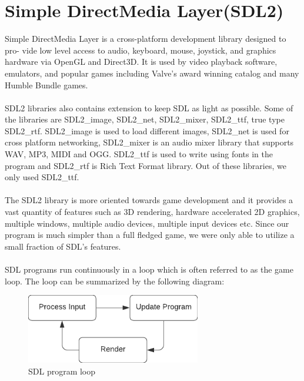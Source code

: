 \documentclass[report]{subfiles}
\begin{document}
    \section{Simple DirectMedia Layer(SDL2)}
    Simple DirectMedia Layer is a cross-platform development library designed to pro-
    vide low level access to audio, keyboard, mouse, joystick, and graphics hardware
    via OpenGL and Direct3D. It is used by video playback software, emulators, and
    popular games including Valve’s award winning catalog and many Humble Bundle
    games.\\\\
    SDL2 libraries also contains extension to keep SDL as light as possible. Some of the
    libraries are SDL2\_image, SDL2\_net, SDL2\_mixer, SDL2\_ttf, true type SDL2\_rtf. SDL2\_image
    is used to load different images, SDL2\_net is used for cross platform networking,
    SDL2\_mixer is an audio mixer library that supports WAV, MP3, MIDI and OGG.
    SDL2\_ttf is used to write using fonts in the program and SDL2\_rtf is Rich Text Format
    library. Out of these libraries, we only used SDL2\_ttf.
    \\\\
    The SDL2 library is more oriented towards game development and it provides a vast quantity of features such as 3D rendering, hardware accelerated 2D graphics, multiple windows, multiple audio devices, multiple input devices etc. 
    Since our program is much simpler than a full fledged game, we were only able to utilize a small fraction of SDL's features.
    \\\\
    SDL programs run continuously in a loop which is often referred to as the game loop. The loop can be summarized by the following diagram:
    \begin{figure}[H]
        \centering
        \includegraphics[width=3in]{graphics/SDL_loop.png}
        \caption{SDL program loop}
    \end{figure}
\end{document}
